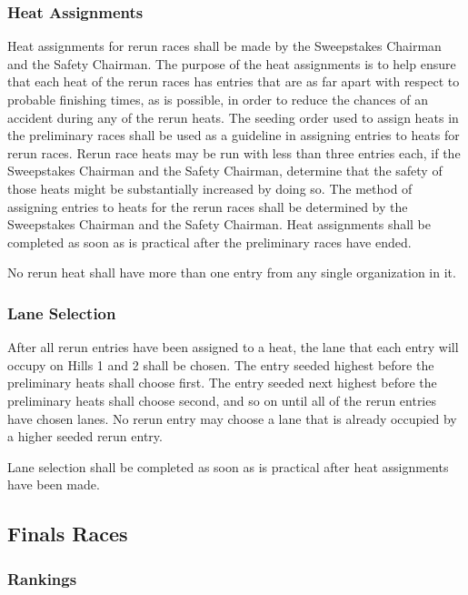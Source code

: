 \subsubsection{Heat Assignments}

	Heat assignments for rerun races shall be made by the Sweepstakes Chairman and
	the Safety Chairman. The purpose of the heat assignments is to help ensure that
	each heat of the rerun races has entries that are as far apart with respect to
	probable finishing times, as is possible, in order to reduce the chances of an
	accident during any of the rerun heats. The seeding order used to assign heats
	in the preliminary races shall be used as a guideline in assigning entries to
	heats for rerun races. Rerun race heats may be run with less than three entries
	each, if the Sweepstakes Chairman and the Safety Chairman, determine that the
	safety of those heats might be substantially increased by doing so. The method
	of assigning entries to heats for the rerun races shall be determined by the
	Sweepstakes Chairman and the Safety Chairman. Heat assignments shall be
	completed as soon as is practical after the preliminary races have ended.

	No rerun heat shall have more than one entry from any single organization in
	it.

\subsubsection{Lane Selection}
	
	After all rerun entries have been assigned to a heat, the lane that each entry
	will occupy on Hills 1 and 2 shall be chosen. The entry seeded highest before
	the preliminary heats shall choose first. The entry seeded next highest before
	the preliminary heats shall choose second, and so on until all of the rerun
	entries have chosen lanes. No rerun entry may choose a lane that is already
	occupied by a higher seeded rerun entry.

	Lane selection shall be completed as soon as is practical after heat
	assignments have been made.

\subsection{Finals Races}

\subsubsection{Rankings}

